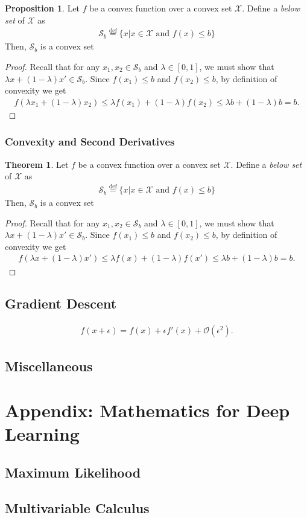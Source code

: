\documentclass[a4paper,12pt]{article}
\theoremstyle{definition}
\newtheorem*{proposition}{Proposition}
\newtheorem*{theorem}{Theorem}
\begin{document}
\begin{proposition}
    Let $f$ be a convex function over a convex set $\mathcal{X}$. Define a \emph{below set} of $\mathcal{X}$ as
    \begin{align*}
        \mathcal{S}_b \stackrel{\mathrm{def}}{=} \{x | x \in \mathcal{X} \text{ and } f(x) \leq b\}
    \end{align*}
    Then, $\mathcal{S}_b$ is a convex set
    \begin{proof}
        Recall that for any $x_1, x_2 \in \mathcal{S}_b$ and $\lambda \in [0, 1]$, we must show that $\lambda x + (1-\lambda) x' \in \mathcal{S}_b$.
        Since $f(x_1) \leq b$ and $f(x_2) \leq b$, by definition of convexity we get
        \begin{align*}
            f(\lambda x_1 + (1-\lambda) x_2) \leq \lambda f(x_1) + (1-\lambda) f(x_2) \leq \lambda b + (1-\lambda) b = b.
        \end{align*}
    \end{proof}
\end{proposition}

\subsubsection*{Convexity and Second Derivatives}

\begin{theorem}
    Let $f$ be a convex function over a convex set $\mathcal{X}$. Define a \emph{below set} of $\mathcal{X}$ as
    \begin{align*}
        \mathcal{S}_b \stackrel{\mathrm{def}}{=} \{x | x \in \mathcal{X} \text{ and } f(x) \leq b\}
    \end{align*}
    Then, $\mathcal{S}_b$ is a convex set
    \begin{proof}
        Recall that for any $x_1, x_2 \in \mathcal{S}_b$ and $\lambda \in [0, 1]$, we must show that $\lambda x + (1-\lambda) x' \in \mathcal{S}_b$.
        Since $f(x_1) \leq b$ and $f(x_2) \leq b$, by definition of convexity we get
        \begin{align*}
            f(\lambda x + (1-\lambda) x') \leq \lambda f(x) + (1-\lambda) f(x') \leq \lambda b + (1-\lambda) b = b.
        \end{align*}
    \end{proof}
\end{theorem}

\subsection{Gradient Descent}
\begin{align*}
    f(x + \epsilon) = f(x) + \epsilon f'(x) + \mathcal{O}(\epsilon^2).
\end{align*}
\newpage
\subsection*{Miscellaneous}

\section{Appendix: Mathematics for Deep Learning}
\subsection{Maximum Likelihood}
\subsection{Multivariable Calculus}
\end{document}
